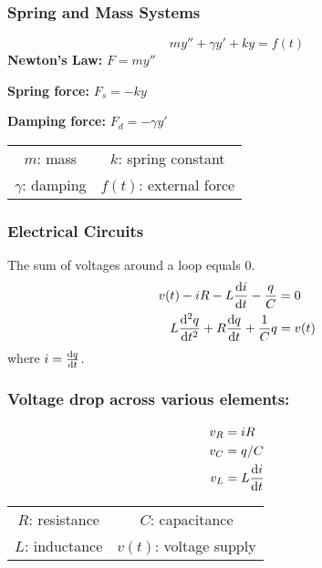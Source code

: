 \documentclass{article}
\begin{document}
\begin{multicols}{3}
    \subsubsection*{Spring and Mass Systems}
    \begin{equation*}
        m y'' + \gamma y' + k y = f(t)
    \end{equation*}
    \textbf{Newton's Law:} $F = m y''$

    \textbf{Spring force:} $F_s = -k y$

    \textbf{Damping force:} $F_d = -\gamma y'$

    \begin{tabular}[H]{c c}
        $m$: mass         & $k$: spring constant   \\
        $\gamma$: damping & $f(t)$: external force
    \end{tabular}
    \subsubsection*{Electrical Circuits}
    The sum of voltages around a loop equals 0.
    \begin{align*}
        v(t) - iR - L \dv{i}{t} - \frac{q}{C}      & = 0    \\
        L \dv[2]{q}{t} + R\dv{q}{t} + \frac{1}{C}q & = v(t)
    \end{align*}
    where $i = \dv{q}{t}$.
    \subsubsection*{Voltage drop across various elements:}
    \begin{align*}
        v_R & = iR          \\
        v_C & = q/C         \\
        v_L & = L \dv{i}{t}
    \end{align*}
    \begin{tabular}[H]{c c}
        $R$: resistance & $C$: capacitance       \\
        $L$: inductance & $v(t)$: voltage supply
    \end{tabular}
\end{multicols}
\end{document}
